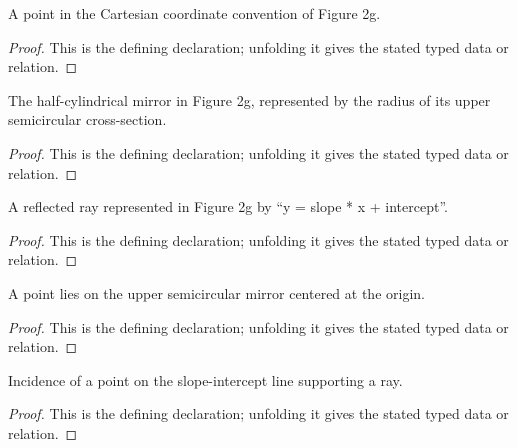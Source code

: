 \begin{definition}[PlanePoint]
  \label{decl:physics:IPhO_2026_2_C_1:PlanePoint}
  A point in the Cartesian coordinate convention of Figure 2g.
\end{definition}
\begin{proof}
  This is the defining declaration; unfolding it gives the stated typed data or relation.
\end{proof}

\begin{definition}[HalfCylindricalMirror]
  \label{decl:physics:IPhO_2026_2_C_1:HalfCylindricalMirror}
  The half-cylindrical mirror in Figure 2g, represented by the radius of its upper semicircular cross-section.
\end{definition}
\begin{proof}
  This is the defining declaration; unfolding it gives the stated typed data or relation.
\end{proof}

\begin{definition}[SlopeInterceptRay]
  \label{decl:physics:IPhO_2026_2_C_1:SlopeInterceptRay}
  A reflected ray represented in Figure 2g by “y = slope * x + intercept”.
\end{definition}
\begin{proof}
  This is the defining declaration; unfolding it gives the stated typed data or relation.
\end{proof}

\begin{definition}[OnUpperHalfMirror]
  \label{decl:physics:IPhO_2026_2_C_1:OnUpperHalfMirror}
  A point lies on the upper semicircular mirror centered at the origin.
\end{definition}
\begin{proof}
  This is the defining declaration; unfolding it gives the stated typed data or relation.
\end{proof}

\begin{definition}[LiesOnRayLine]
  \label{decl:physics:IPhO_2026_2_C_1:LiesOnRayLine}
  Incidence of a point on the slope-intercept line supporting a ray.
\end{definition}
\begin{proof}
  This is the defining declaration; unfolding it gives the stated typed data or relation.
\end{proof}

